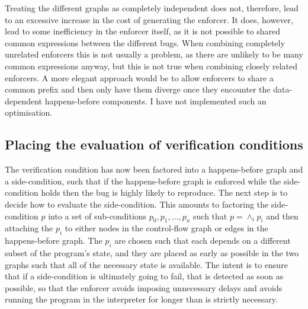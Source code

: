 Treating the different graphs as completely independent does not,
therefore, lead to an excessive increase in the cost of generating the
enforcer.  It does, however, lead to some inefficiency in the enforcer
itself, as it is not possible to shared common expressions between the
different bugs.  When combining completely unrelated enforcers this is
not usually a problem, as there are unlikely to be many common
expressions anyway, but this is not true when combining closely
related enforcers.  A more elegant approach would be to allow
enforcers to share a common prefix and then only have them diverge
once they encounter the data-dependent happens-before components.  I
have not implemented such an optimisation.

\subsection{Placing the evaluation of verification conditions}
\label{sect:enforce:place_vcs}

The verification condition has now been factored into a happens-before
graph and a side-condition, such that if the happens-before graph is
enforced while the side-condition holds then the bug is highly likely
to reproduce.  The next step is to decide how to evaluate the
side-condition.  This amounts to factoring the side-condition $p$ into
a set of sub-conditions $p_0, p_1, {\ldots}, p_n$ such that $p =
\wedge_i p_i$ and then attaching the $p_i$ to either nodes in the
control-flow graph or edges in the happens-before graph.  The $p_i$
are chosen such that each depends on a different subset of the
program's state, and they are placed as early as possible in the two
graphs such that all of the necessary state is available.  The intent
is to ensure that if a side-condition is ultimately going to fail,
that is detected as soon as possible, so that the enforcer avoids
imposing unnecessary delays and avoids running the program in the
interpreter for longer than is strictly necessary.

